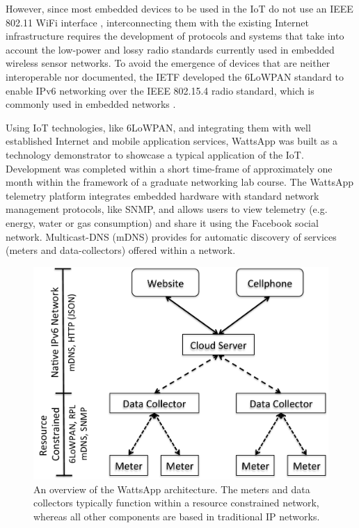 \documentclass[10pt, conference, compsocconf, english]{IEEEtran}
\begin{document}
However, since most embedded devices to be used in the IoT do not
use an IEEE 802.11 WiFi interface \cite{durvy08making}, interconnecting
them with the existing Internet infrastructure requires the development
of protocols and systems that take into account the low-power and
lossy radio standards currently used in embedded wireless sensor networks.
To avoid the emergence of devices that are neither interoperable nor documented, the IETF developed the 6LoWPAN standard \cite{rfc-4,rfc-5} to enable IPv6 networking over the IEEE 802.15.4 radio standard, which is commonly used in embedded networks \cite{6lowpan-1}.

Using IoT technologies, like 6LoWPAN, and integrating them with well
established Internet and mobile application services, WattsApp was
built as a technology demonstrator to showcase a typical application
of the IoT. Development was completed within a short time-frame of
approximately one month within the framework of a graduate networking
lab course. The WattsApp telemetry platform integrates embedded hardware
with standard network management protocols, like SNMP, and allows
users to view telemetry (e.g. energy, water or gas consumption) and
share it using the Facebook social network. Multicast-DNS (mDNS) provides
for automatic discovery of services (meters and data-collectors) offered
within a network.

\begin{figure}[t]
\begin{centering}
\includegraphics[scale=0.4]{images/wattsapp-overview} 
\par\end{centering}

\caption{An overview of the WattsApp architecture. The meters and data collectors
typically function within a resource constrained network, whereas
all other components are based in traditional IP networks.\label{fig:wattsapp}}
\end{figure}
\end{document}
